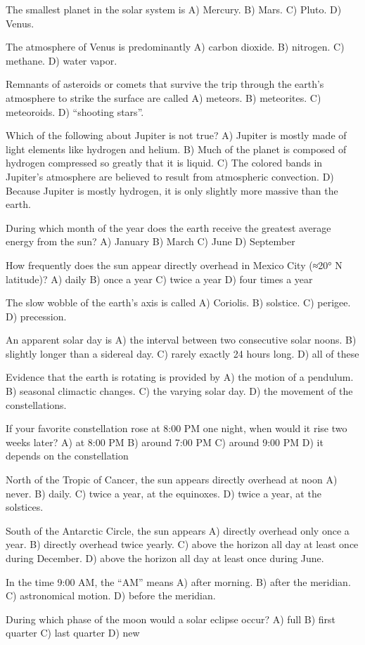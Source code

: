The smallest planet in the solar system is
    A)  Mercury.
    B)  Mars.
    C)  Pluto.
    D)  Venus.

The atmosphere of Venus is predominantly
    A)  carbon dioxide.
    B)  nitrogen.
    C)  methane.
    D)  water vapor.

Remnants of asteroids or comets that survive the trip through the earth's atmosphere to strike the surface are called
    A)  meteors.
    B)  meteorites.
    C)  meteoroids.
    D)  ``shooting stars''.

Which of the following about Jupiter is not true?
    A)  Jupiter is mostly made of light elements like hydrogen and helium.
    B)  Much of the planet is composed of hydrogen compressed so greatly that it is liquid.
    C)  The colored bands in Jupiter's atmosphere are believed to result from atmospheric convection.
    D)  Because Jupiter is mostly hydrogen, it is only slightly more massive than the earth.



During which month of the year does the earth receive the greatest average energy from the sun?
    A)  January
    B)  March
    C)  June
    D)  September

How frequently does the sun appear directly overhead in Mexico City (≈20° N latitude)?
    A)  daily
    B)  once a year
    C)  twice a year
    D)  four times a year

The slow wobble of the earth's axis is called
    A)  Coriolis.
    B)  solstice.
    C)  perigee.
    D)  precession.

An apparent solar day is
    A)  the interval between two consecutive solar noons.
    B)  slightly longer than a sidereal day.
    C)  rarely exactly 24 hours long.
    D)  all of these

Evidence that the earth is rotating is provided by
    A)  the motion of a pendulum.
    B)  seasonal climactic changes.
    C)  the varying solar day.
    D)  the movement of the constellations.

If your favorite constellation rose at 8:00 PM one night, when would it rise two weeks later?
    A)  at 8:00 PM
    B)  around 7:00 PM
    C)  around 9:00 PM
    D)  it depends on the constellation

North of the Tropic of Cancer, the sun appears directly overhead at noon
    A)  never.
    B)  daily.
    C)  twice a year, at the equinoxes.
    D)  twice a year, at the solstices.

South of the Antarctic Circle, the sun appears
    A)  directly overhead only once a year.
    B)  directly overhead twice yearly.
    C)  above the horizon all day at least once during December.
    D)  above the horizon all day at least once during June.

In the time 9:00 AM, the ``AM'' means
    A)  after morning.
    B)  after the meridian.
    C)  astronomical motion.
    D)  before the meridian.

During which phase of the moon would a solar eclipse occur?
    A)  full
    B)  first quarter
    C)  last quarter
    D)  new

